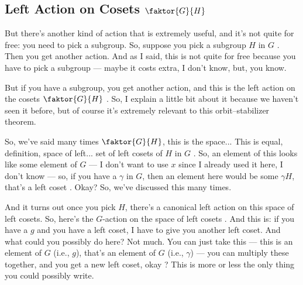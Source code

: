 \subsection{Left Action on Cosets \texorpdfstring{$\faktor{G}{H}$}{G/H}}

\begin{speech}[00:10:16 - 00:12:14]
But there's another kind of action that is extremely useful, and it's not quite for free: you need to pick a subgroup. So, suppose you pick a subgroup $H$ in $G$ . Then you get another action. And as I said, this is not quite for free because you have to pick a subgroup --- maybe it costs extra, I don't know, but, you know.

But if you have a subgroup, you get another action, and this is the left action on the cosets $\faktor{G}{H}$ . So, I explain a little bit about it because we haven't seen it before, but of course it's extremely relevant to this orbit--stabilizer theorem.

So, we've said many times $\faktor{G}{H}$, this is the space... This is equal, definition, space of left... set of left cosets of $H$ in $G$ . So, an element of this looks like some element of $G$ --- I don't want to use $x$ since I already used it here, I don't know --- so, if you have a $\gamma$ in $G$, then an element here would be some $\gamma H$, that's a left coset . Okay? So, we've discussed this many times.

And it turns out once you pick $H$, there's a canonical left action on this space of left cosets. So, here's the $G$-action on the space of left cosets . And this is: if you have a $g$ and you have a left coset, I have to give you another left coset. And what could you possibly do here? Not much. You can just take this --- this is an element of $G$ (i.e., $g$), that's an element of $G$ (i.e., $\gamma$) --- you can multiply these together, and you get a new left coset, okay ? This is more or less the only thing you could possibly write.
\end{speech}

